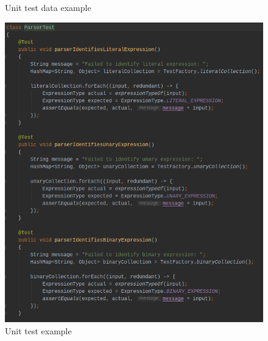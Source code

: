 \documentclass[
]{report}
\begin{document}
\begin{appendices}
\begin{figure}
		\caption{Unit test data example}
		\label{fig:test-data-example}
	\end{figure}
	\begin{figure}
		\centering
		\includegraphics[width=\textwidth]{test-example}
		\caption{Unit test example}
		\label{fig:test-example}
	\end{figure}

\end{appendices}
\end{document}
